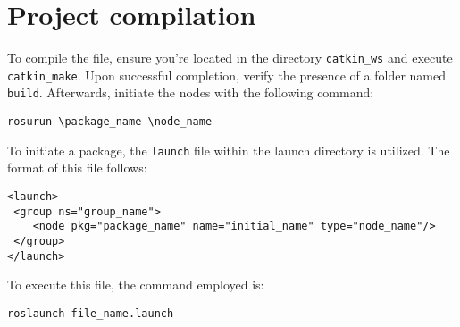 \section{Project compilation}

To compile the file, ensure you're located in the directory \texttt{catkin\_ws} and execute \texttt{catkin\_make}. 
Upon successful completion, verify the presence of a folder named \texttt{build}. 
Afterwards, initiate the nodes with the following command:
\begin{verbatim}
rosurun \package_name \node_name
\end{verbatim}

To initiate a package, the \texttt{launch} file within the launch directory is utilized. 
The format of this file follows:
\begin{verbatim}
<launch>
 <group ns="group_name">
    <node pkg="package_name" name="initial_name" type="node_name"/>
 </group>
</launch>
\end{verbatim}
To execute this file, the command employed is:
\begin{verbatim}
roslaunch file_name.launch
\end{verbatim}